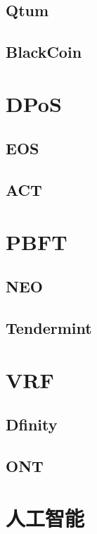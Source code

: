 \documentclass[UTF8]{ctexart}
\begin{document}
\subsection{Qtum}

\subsection{BlackCoin}

\section{DPoS}

\subsection{EOS}

\subsection{ACT}

\section{PBFT}

\subsection{NEO}

\subsection{Tendermint}

\section{VRF}

\subsection{Dfinity}

\subsection{ONT}

\section{人工智能}
\end{document}
